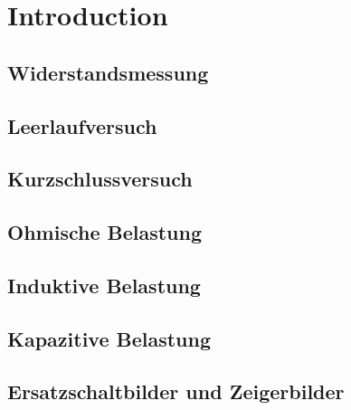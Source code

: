 \documentclass[11pt]{article}
\begin{document}

\section{Introduction}

\subsection{Widerstandsmessung}



\subsection{Leerlaufversuch}



\subsection{Kurzschlussversuch}


\subsection{Ohmische Belastung}


\subsection{Induktive Belastung}


\subsection{Kapazitive Belastung}


\subsection{Ersatzschaltbilder und Zeigerbilder}

\end{document}
